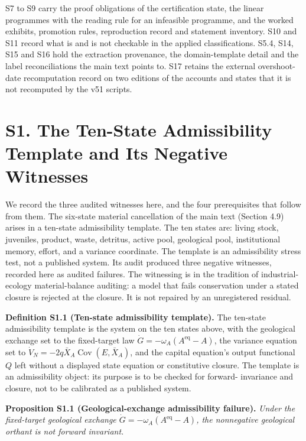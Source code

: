 \documentclass[11pt]{article}
\begin{document}
S7 to S9 carry the proof obligations of the certification state, the linear programmes with the reading rule for an infeasible programme, and the worked exhibits, promotion rules, reproduction record and statement inventory. S10 and S11 record what is and is not checkable in the applied classifications. S5.4, S14, S15 and S16 hold the extraction provenance, the domain-template detail and the label reconciliations the main text points to. S17 retains the external overshoot-date recomputation record on two editions of the accounts and states that it is not recomputed by the v51 scripts.

\vspace{0.8em}

\section*{S1. The Ten-State Admissibility Template and Its Negative Witnesses}\label{s1-the-ten-state-admissibility-template-and-its-negative-witnesses}

We record the three audited witnesses here, and the four prerequisites that follow from them. The six-state material cancellation of the main text (Section 4.9) arises in a ten-state admissibility template. The ten states are: living stock, juveniles, product, waste, detritus, active pool, geological pool, institutional memory, effort, and a variance coordinate. The template is an admissibility stress test, not a published system. Its audit produced three negative witnesses, recorded here as audited failures. The witnessing is in the tradition of industrial-ecology material-balance auditing: a model that fails conservation under a stated closure is rejected at the closure. It is not repaired by an unregistered residual.

\textbf{Definition S1.1 (Ten-state admissibility template).} The ten-state admissibility template is the system on the ten states above, with the geological exchange set to the fixed-target law \(\dot G = -\omega_A(A^{\mathrm{eq}} - A)\), the variance equation set to \(\dot V_N = -2q\bar X_A \operatorname{Cov}(E, \bar X_A)\), and the capital equation's output functional \(Q\) left without a displayed state equation or constitutive closure. The template is an admissibility object: its purpose is to be checked for forward- invariance and closure, not to be calibrated as a published system.

\textbf{Proposition S1.1 (Geological-exchange admissibility failure).} \emph{Under the fixed-target geological exchange \(\dot G = -\omega_A(A^{\mathrm{eq}} - A)\), the nonnegative geological orthant is not forward invariant.}
\end{document}

